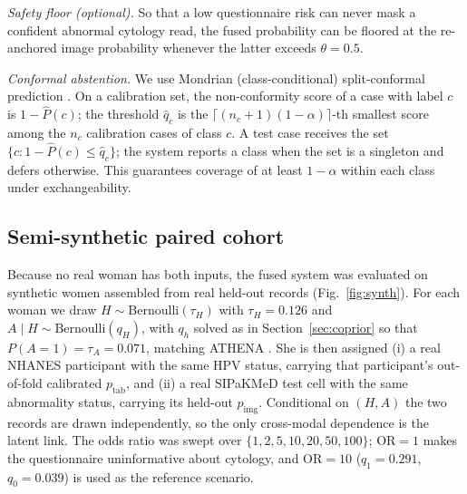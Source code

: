\documentclass[lettersize,journal]{IEEEtran}
\newcommand{\pimg}{p_{\mathrm{img}}}
\newcommand{\ptab}{p_{\mathrm{tab}}}
\begin{document}
\emph{Safety floor (optional).} So that a low questionnaire risk can never mask a confident abnormal cytology read, the fused probability can be floored at the re-anchored image probability whenever the latter exceeds $\theta = 0.5$.

\emph{Conformal abstention.} We use Mondrian (class-conditional) split-conformal prediction \cite{vovk2005algorithmic,angelopoulos2023conformal}. On a calibration set, the non-conformity score of a case with label $c$ is $1-\hat P(c)$; the threshold $\hat q_c$ is the $\lceil (n_c+1)(1-\alpha)\rceil$-th smallest score among the $n_c$ calibration cases of class $c$. A test case receives the set $\{c : 1-\hat P(c) \le \hat q_c\}$; the system reports a class when the set is a singleton and defers otherwise. This guarantees coverage of at least $1-\alpha$ within each class under exchangeability.

\subsection{Semi-synthetic paired cohort}
\label{sec:synthetic}
Because no real woman has both inputs, the fused system was evaluated on synthetic women assembled from real held-out records (Fig.~\ref{fig:synth}). For each woman we draw $H\sim\mathrm{Bernoulli}(\tau_H)$ with $\tau_H=0.126$ and $A\mid H\sim\mathrm{Bernoulli}(q_H)$, with $q_h$ solved as in Section~\ref{sec:coprior} so that $P(A{=}1)=\tau_A=0.071$, matching ATHENA \cite{wright2012athena}. She is then assigned (i) a real NHANES participant with the same HPV status, carrying that participant's out-of-fold calibrated $\ptab$, and (ii) a real SIPaKMeD test cell with the same abnormality status, carrying its held-out $\pimg$. Conditional on $(H,A)$ the two records are drawn independently, so the only cross-modal dependence is the latent link. The odds ratio was swept over $\{1,2,5,10,20,50,100\}$; $\mathrm{OR}=1$ makes the questionnaire uninformative about cytology, and $\mathrm{OR}=10$ ($q_1=0.291$, $q_0=0.039$) is used as the reference scenario.
\end{document}

